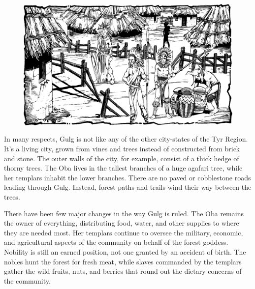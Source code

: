 {
\begin{figure}[b!]
\centering
\includegraphics[width=\textwidth]{images/gulg-2.png}
\WOTC
\end{figure}

	In many respects, Gulg is not like any of the other city-states of the Tyr Region. It's a living city, grown from vines and trees instead of constructed from brick and stone. The outer walls of the city, for example, consist of a thick hedge of thorny trees. The Oba lives in the tallest branches of a huge agafari tree, while her templars inhabit the lower branches. There are no paved or cobblestone roads leading through Gulg. Instead, forest paths and trails wind their way between the trees.

	There have been few major changes in the way Gulg is ruled. The Oba remains the owner of everything, distributing food, water, and other supplies to where they are needed most. Her templars continue to oversee the military, economic, and agricultural aspects of the community on behalf of the forest goddess. Nobility is still an earned position, not one granted by an accident of birth. The nobles hunt the forest for fresh meat, while slaves commanded by the templars gather the wild fruits, nuts, and berries that round out the dietary concerns of the community.
}

